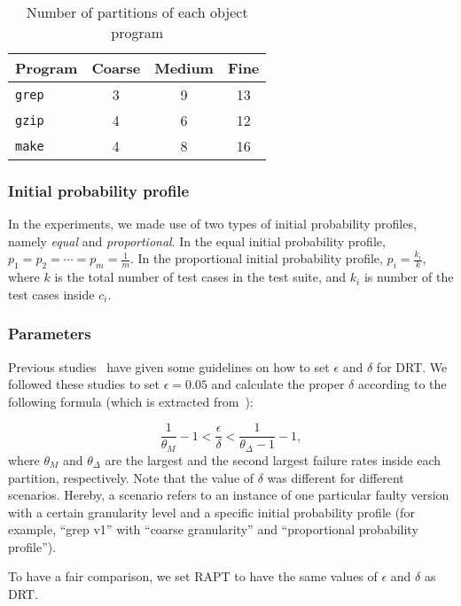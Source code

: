 \documentclass[10pt,journal,compsoc]{IEEEtran}
\begin{document}
\begin{table}
\caption{Number of partitions of each object program}
\label{tab:gra}
\centering
\begin{tabular}{|l|c|c|c|} \hline
Program				& Coarse	& Medium	& Fine	\\ \hline
\texttt{grep}	& 3				& 9				& 13		\\ \hline
\texttt{gzip}	& 4				& 6				& 12		\\ \hline
\texttt{make}	& 4				& 8				& 16		\\ \hline
\end{tabular}
\end{table}

\subsubsection{Initial probability profile}
In the experiments, we made use of two types of initial probability profiles, namely \textit{equal} and \textit{proportional}. In the equal initial probability profile, $p_1 = p_2 = \cdots = p_m = \displaystyle\frac{1}{m}$. In the proportional initial probability profile, $p_i = \displaystyle\frac{k_i}{k}$, where $k$ is the total number of test cases in the test suite, and $k_i$ is number of the test cases inside $c_i$.

\subsubsection{Parameters}
Previous studies~\cite{Lv11, Yang14, Li15} have given some guidelines on how to set $\epsilon$ and $\delta$ for DRT. We followed these studies to set $\epsilon = 0.05$ and calculate the proper $\delta$ according to the following formula (which is extracted from~\cite{Li15}):

\begin{equation}
\frac{1}{\theta_M}-1 < \frac{\epsilon}{\delta} < \frac{1}{\theta_\Delta-1}-1,
\end{equation}
where $\theta_M$ and $\theta_\Delta$ are the largest and the second largest failure rates inside each partition, respectively. Note that the value of $\delta$ was different for different scenarios. Hereby, a scenario refers to an instance of one particular faulty version with a certain granularity level and a specific initial probability profile (for example, ``grep v1'' with ``coarse granularity'' and ``proportional probability profile'').

To have a fair comparison, we set RAPT to have the same values of $\epsilon$ and $\delta$ as DRT.
\end{document}
